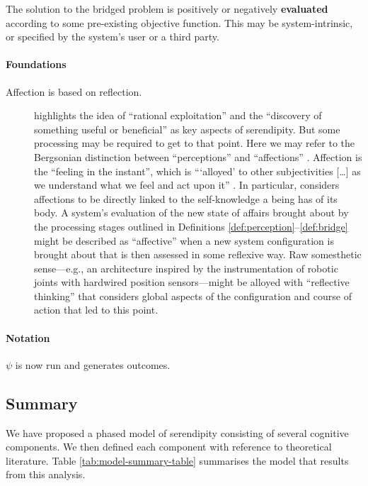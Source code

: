 \begin{defn}\label{def:result}
\hypertarget{def:result}{}The solution to the bridged problem is positively or negatively
\textbf{evaluated} according to some pre-existing objective function.
This may be system-intrinsic, or specified by the system's user or a third party.
\end{defn}

\paragraph{\textbf{\upshape Foundations}}
                                         
\begin{description}                      
\item[Affection is based on reflection.]
\citet{campbell2005serendipity} highlights the idea of ``rational
exploitation'' and the ``discovery of something useful or
beneficial'' as key aspects of serendipity.
But some processing may be required
to get to that point. Here we may refer to the Bergsonian
distinction
between ``perceptions'' and ``affections''
\cite[p.~23]{deleuze1991bergsonism}.
Affection is the ``feeling in the instant'', which is {``}`alloyed'
to other subjectivities [\ldots] as we understand what we feel and
act upon it'' \cite[p.~141]{sutton2008deleuze}.
In particular,
\citet[p.~17]{bergson1991matter} considers affections to be directly
linked to the self-knowledge a being has of its body.  A system's
evaluation of the new state of affairs brought about by the processing
stages outlined in Definitions \ref{def:perception}--\ref{def:bridge}
might be described as ``affective''
when a new system configuration is brought about that is then assessed
in some reflexive way.  Raw somesthetic sense---e.g., an architecture inspired by
the instrumentation of robotic joints with hardwired position
sensors---might be alloyed with ``reflective thinking'' \cite{singh2005architecture}
that considers global aspects of the configuration and course of action
that led to this point.
\end{description}                        

\paragraph{\textbf{\upshape Notation}}

$\psi$ is now run and generates outcomes.

\subsection{Summary}
We have proposed a phased model of serendipity consisting of several
cognitive components.  We then defined each component with reference
to theoretical literature.  Table \ref{tab:model-summary-table}
summarises the model that results from this analysis.


